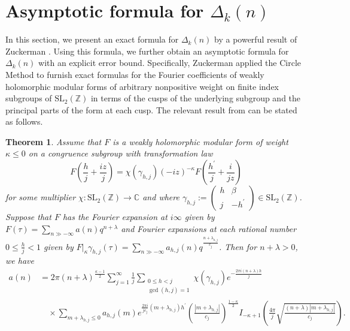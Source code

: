 \documentclass[12pt]{article}
\newtheorem{thm}{Theorem}[section]
\numberwithin{equation}{section}
\begin{document}
\section{Asymptotic formula for $\Delta_{k}(n)$}\label{sec:asm}
In this section, we present an exact formula for $\Delta_{k}(n)$ by a powerful result of Zuckerman \cite{Zuckerman-1939}. Using this formula, we further obtain an asymptotic formula for $\Delta_{k}(n)$ with an explicit error bound. Specifically, Zuckerman applied the Circle Method to furnish exact formulas for the Fourier coefficients of weakly holomorphic modular forms of arbitrary nonpositive weight on finite index subgroups of $\mathrm{SL}_{2}(\mathbb{Z})$ in terms of the cusps of the underlying subgroup and the principal parts of the form at each cusp. The relevant result from \cite[Theorem 1]{Zuckerman-1939} can be stated as follows.

\begin{thm}\label{zuc-asym}
Assume that $F$ is a weakly holomorphic modular form of weight $\kappa \leq 0$ on a congruence subgroup
with transformation law
\[
F\left( \frac{h}{j} + \frac{iz}{j} \right) = \chi(\gamma_{h,j}) (-iz)^{-\kappa} F\left( \frac{h^{\prime}}{j} + \frac{i}{jz} \right)
\]
for some multiplier $\chi:\mathrm{SL}_{2}(\mathbb{Z})\rightarrow\mathbb{C}$
and where $\gamma_{h,j} := \begin{pmatrix} h & \beta \\ j & -h^{\prime} \end{pmatrix} \in \mathrm{SL}_{2}(\mathbb{Z})$.
Suppose that $F$ has the
Fourier expansion at $i\infty$ given by $F(\tau) = \sum_{n \gg -\infty} a(n) q^{n+\lambda}$ and
Fourier expansions at each rational number $0 \leq \frac{h}{j} < 1$ given by
$\left. F \right|_{\kappa} \gamma_{h,j}(\tau) = \sum_{n \gg -\infty} a_{h,j}(n) q^{\frac{n + \lambda_{h,j}}{c_{j}}}
$. Then for $n + \lambda > 0$, we have
\begin{align*}
a(n) &= 2\pi (n + \lambda)^{\frac{\kappa - 1}{2}} \sum_{j=1}^{\infty} \frac{1}{j} \sum_{\substack{0 \leq h < j \\ \gcd(h,j) = 1}} \chi(\gamma_{h,j}) e^{-\frac{2\pi i (n + \lambda) h}{j}} \\
&\quad \times \sum_{m + \lambda_{h,j} \leq 0} a_{h,j}(m) e^{\frac{2\pi i}{j c_{j}} (m + \lambda_{h,j}) h^{\prime}} \left( \frac{|m + \lambda_{h,j}|}{c_{j}} \right)^{\frac{1 - \kappa}{2}} I_{-\kappa + 1} \left( \frac{4\pi}{j} \sqrt{\frac{(n + \lambda) |m + \lambda_{h,j}|}{c_{j}}} \right).
\end{align*}
\end{thm}
\end{document}
